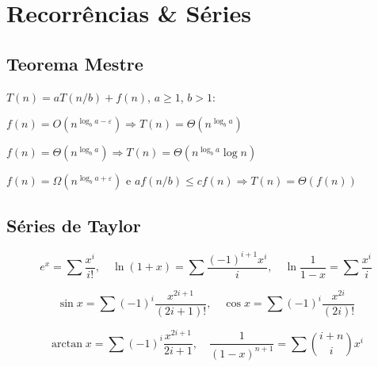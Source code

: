 \setlength{\parindent}{0pt}

\section{Recorrências \& Séries}

\subsection{Teorema Mestre}

$T(n)=aT(n/b)+f(n)$, $a\geq1$, $b>1$:

$f(n)=O(n^{\log_b a-\varepsilon})\Rightarrow T(n)=\Theta(n^{\log_b a})$

$f(n)=\Theta(n^{\log_b a})\Rightarrow T(n)=\Theta(n^{\log_b a}\log n)$

$f(n)=\Omega(n^{\log_b a+\varepsilon})$ e $af(n/b)\leq cf(n)\Rightarrow T(n)=\Theta(f(n))$

\subsection{Séries de Taylor}

\[e^x=\sum\frac{x^i}{i!}, \quad \ln(1{+}x)=\sum\frac{(-1)^{i+1}x^i}{i}, \quad \ln\frac{1}{1{-}x}=\sum\frac{x^i}{i}\]

\[\sin x=\sum(-1)^i\frac{x^{2i+1}}{(2i+1)!}, \quad \cos x=\sum(-1)^i\frac{x^{2i}}{(2i)!}\]

\[\arctan x=\sum(-1)^i\frac{x^{2i+1}}{2i+1}, \quad \frac{1}{(1-x)^{n+1}}=\sum\binom{i+n}{i}x^i\]
